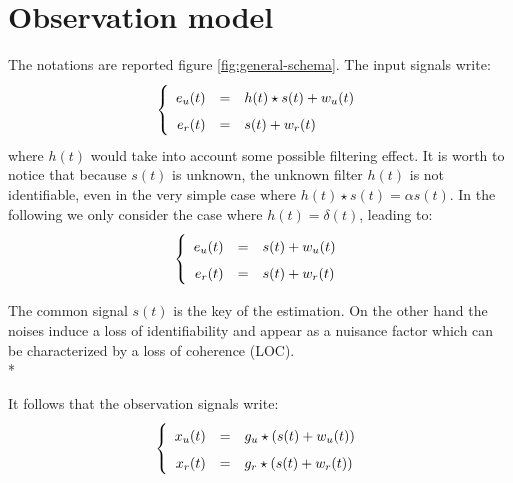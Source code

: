 \section{Observation model}
The notations are reported figure \ref{fig:general-schema}. The input signals write:
\begin{eqnarray}
\label{eq:model-of-excitation}
\left\{
\renewcommand\arraystretch{1.6}
\begin{array}{rcl}
e_{\ut}(t)&=&h(t) \star s(t)+w_{\ut}(t)
\\
e_{\rf}(t)&=&s(t)+w_{\rf}(t)
\end{array}
\right.
\end{eqnarray}
where $h(t)$ would take into account some possible filtering effect. It is worth to notice that because $s(t)$ is unknown, the unknown filter $h(t)$ is not identifiable, even in the very simple case where $h(t) \star s(t)=\alpha s(t)$. In the following we only consider the case where $h(t)=\delta(t)$, leading to:
\begin{eqnarray}
\label{eq:model-of-excitation}
\left\{
\renewcommand\arraystretch{1.6}
\begin{array}{rcl}
e_{\ut}(t)&=&s(t)+w_{\ut}(t)
\\
e_{\rf}(t)&=&s(t)+w_{\rf}(t)
\end{array}
\right.
\end{eqnarray}


The common signal $s(t)$ is the key of the estimation. On the other hand the noises induce a loss of identifiability and appear as a nuisance factor which can be characterized by a loss of coherence (LOC). \\*


It follows that the observation signals write:
\begin{eqnarray}
\label{eq:model-of-obervation}
\left\{
\renewcommand\arraystretch{1.6}
\begin{array}{rcl}
x_{\ut}(t)&=&g_{\ut} \star(s(t)+w_{\ut}(t))
\\
x_{\rf}(t)&=&g_{\rf} \star (s(t)+w_{\rf}(t))
\end{array}
\right.
\end{eqnarray}


